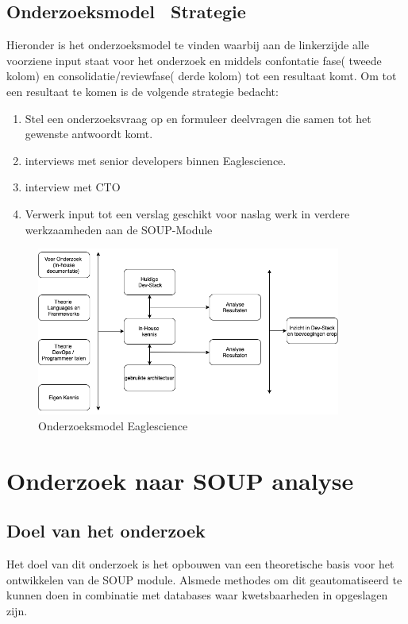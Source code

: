 \subsection{Onderzoeksmodel \ Strategie}
Hieronder is het onderzoeksmodel te vinden waarbij aan de linkerzijde alle voorziene input staat voor het onderzoek en middels confontatie fase( tweede kolom) en consolidatie/reviewfase( derde kolom) tot een resultaat komt. Om tot een resultaat te komen is de volgende strategie bedacht:
\begin{enumerate}
  \item Stel een onderzoeksvraag op en formuleer deelvragen die samen tot het gewenste antwoordt komt.
  \item interviews met senior developers binnen Eaglescience.
  \item interview met CTO
  \item Verwerk input tot een verslag geschikt voor naslag werk in verdere werkzaamheden aan de SOUP-Module
\end{enumerate}
\begin{figure}[h!]
\myfloatalign
\includegraphics[width=10cm]{gfx/OnderzoeksmodelES}
\caption{Onderzoeksmodel Eaglescience}
\label{fig:Onderzoeks model Eaglescience}
\end{figure}


\section{Onderzoek naar SOUP analyse}
\subsection{Doel van het onderzoek}
Het doel van dit onderzoek is het opbouwen van een theoretische basis voor het ontwikkelen van de SOUP module. Alsmede methodes om dit geautomatiseerd te kunnen doen in combinatie met databases waar kwetsbaarheden in opgeslagen zijn.


